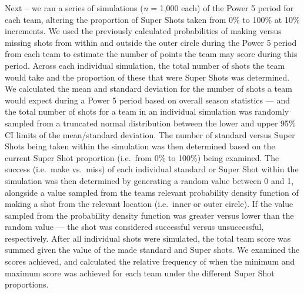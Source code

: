 \documentclass[]{elsarticle} %
\begin{document}
Next -- we ran a series of simulations (\emph{n} = 1,000 each) of the
Power 5 period for each team, altering the proportion of Super Shots
taken from 0\% to 100\% at 10\% increments. We used the previously
calculated probabilities of making versus missing shots from within and
outside the outer circle during the Power 5 period from each team to
estimate the number of points the team may score during this period.
Across each individual simulation, the total number of shots the team
would take and the proportion of these that were Super Shots was
determined. We calculated the mean and standard deviation for the number
of shots a team would expect during a Power 5 period based on overall
season statistics --- and the total number of shots for a team in an
individual simulation was randomly sampled from a truncated normal
distribution between the lower and upper 95\% CI limits of the
mean/standard deviation. The number of standard versus Super Shots being
taken within the simulation was then determined based on the current
Super Shot proportion (i.e.~from 0\% to 100\%) being examined. The
success (i.e.~make vs.~miss) of each individual standard or Super Shot
within the simulation was then determined by generating a random value
between 0 and 1, alongside a value sampled from the teams relevant
probability density function of making a shot from the relevant location
(i.e.~inner or outer circle). If the value sampled from the probability
density function was greater versus lower than the random value --- the
shot was considered successful versus unsuccessful, respectively. After
all individual shots were simulated, the total team score was summed
given the value of the made standard and Super shots. We examined the
scores achieved, and calculated the relative frequency of when the
minimum and maximum score was achieved for each team under the different
Super Shot proportions.
\end{document}
